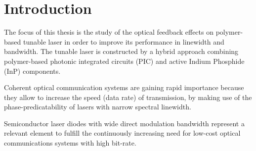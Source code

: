 \chapter{Introduction}
\label{ch:Introduction}
The focus of this thesis is the study of the optical feedback effects on polymer-based tunable laser in order to improve its performance in linewidth and bandwidth. The tunable laser is constructed by a hybrid approach combining polymer-based photonic integrated circuits (PIC) and active Indium Phosphide (InP) components.


Coherent optical communication systems are gaining rapid importance because they allow to increase the speed (data rate) of transmission, by making use of the phase-predicatability of lasers with narrow spectral linewidth.

Semiconductor laser diodes with wide direct modulation bandwidth represent a relevant element to fulfill the continuously increasing need for low-cost optical communications systems with high bit-rate.

